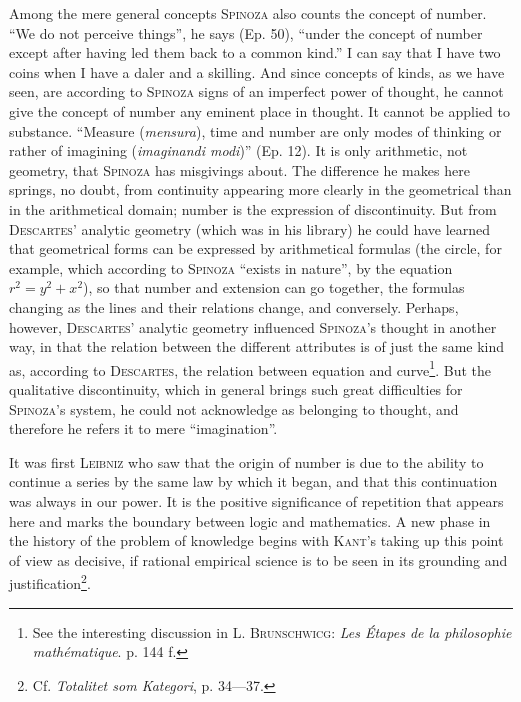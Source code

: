 \documentclass[12pt]{article}
\newcommand{\opage}[1]{\marginnote{\footnotesize\textit{[#1]}}}
\begin{document}
Among the mere general concepts \textsc{Spinoza} also counts the concept of number. ``We
do not perceive things'', he says (Ep. 50), ``under the concept of number except after
having led them back to a common kind.'' I can say that I have two coins when I have a
daler and a skilling. And since concepts of kinds, as we have seen, are according to
\textsc{Spinoza} signs of an imperfect power of thought, he cannot give the concept of number
any eminent place in thought. It cannot be applied to substance. ``Measure
(\textit{mensura}), time and number are only modes of thinking or rather of imagining
(\textit{imaginandi modi})'' (Ep. 12). It is only arithmetic, not geometry, that
\textsc{Spinoza} has misgivings about. The difference he makes here springs, no doubt, from
continuity appearing more clearly in the geometrical than in the arithmetical domain; number
is the expression of discontinuity. But from \textsc{Descartes}' analytic geometry (which
was in his library) he could have learned that geometrical forms can be expressed by
arithmetical formulas (the circle, for example, which according to \textsc{Spinoza} ``exists
in nature'', by the equation $r^2 = y^2 + x^2$), so that number and extension can go
together, the formulas changing as the lines and their relations change, and conversely.
Perhaps, however, \textsc{Descartes}' analytic geometry influenced \textsc{Spinoza}'s
thought in another way, in that the relation between the different attributes is of just
the same kind as, according to \textsc{Descartes}, the relation between equation and
curve\footnote{See the interesting discussion in L. \textsc{Brunschwicg}: \textit{Les
Étapes de la philosophie mathématique}. p. 144 f.}. %
But the qualitative discontinuity, which in general brings such great difficulties for
\textsc{Spinoza}'s system, he could not acknowledge as belonging to thought, and therefore
he refers it to mere ``imagination''.

It was first \textsc{Leibniz} who saw that the origin of number is due to the ability to
continue a series by the same law by which it began, and that this
con\opage{50}tinuation was always in our power. It is the positive significance of repetition
that appears here and marks the boundary between logic and mathematics. A new phase in the
history of the problem of knowledge begins with \textsc{Kant}'s taking up this point of view
as decisive, if rational empirical science is to be seen in its grounding and
justification\footnote{Cf. \textit{Totalitet som Kategori}, p. 34---37.}.
\end{document}
